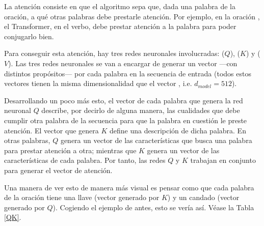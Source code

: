 La atención consiste en que el algoritmo sepa que, dada una palabra de la oración, a qué otras palabras debe prestarle atención. Por ejemplo, en la oración , el Transformer, en el verbo, debe prestar atención a la palabra  para poder conjugarlo bien.

Para conseguir esta atención, hay tres redes neuronales involucradas:  ($Q$),  ($K$) y  ($V$). Las tres redes neuronales se van a encargar de generar un vector ---con distintos propósitos--- por cada palabra en la secuencia de entrada (todos estos vectores tienen la misma dimensionalidad que el vector , i.e. $d_{model} = 512$). 

Desarrollando un poco más esto, el vector de cada palabra que genera la red neuronal $Q$ describe, por decirlo de alguna manera, las cualidades que debe cumplir otra palabra de la secuencia para que la palabra en cuestión le preste atención. El vector que genera $K$ define una descripción de dicha palabra. En otras palabras, $Q$ genera un vector de las características que busca una palabra para prestar atención a otra; mientras que $K$ genera un vector de las características de cada palabra. Por tanto, las redes $Q$ y $K$ trabajan en conjunto para generar el vector de atención. 

Una manera de ver esto de manera más visual es pensar como que cada palabra de la oración tiene una llave (vector generado por $K$) y un candado (vector generado por $Q$). Cogiendo el ejemplo de antes, esto se vería así. Véase la Tabla \ref{QK}.

